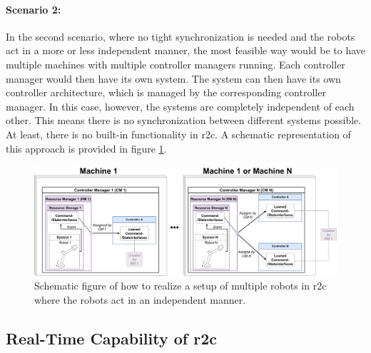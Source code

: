 \paragraph{Scenario 2:} 
In the second scenario, where no tight synchronization is needed and the robots act in a more or less independent manner, the most feasible way would be to have multiple machines with multiple controller managers running. Each controller manager would then have its own system. The system can then have its own controller architecture, which is managed by the corresponding controller manager. \newline
In this case, however, the systems are completely independent of each other. This means there is no synchronization between different systems possible. At least, there is no built-in functionality in \gls{r2c}. A schematic representation of this approach is provided in figure \ref{c3_fig_r2c_mr_is}.
\begin{figure}[htbp]
	\centering
	\includegraphics[width=1\textwidth]{Figures/c3/multiple_independent_robots_current.pdf}
	\caption{Schematic figure of how to realize a setup of multiple robots in \gls{r2c} where the robots act in an independent manner.}
	\label{c3_fig_r2c_mr_is}
\end{figure}


\subsection{Real-Time Capability of \gls{r2c}}





